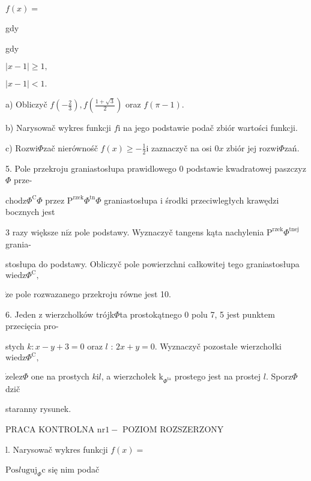 \documentclass[a4paper,12pt]{article}
\begin{document}
$f(x)=$

gdy

gdy

$|x-1|\geq 1,$

$|x-1|<1.$

a) Obliczyč $f(-\displaystyle \frac{2}{3}), f(\displaystyle \frac{1+\sqrt{3}}{2})$ oraz $f(\pi-1).$

b) Narysowač wykres funkcji $f\mathrm{i}$ na jego podstawie podač zbiór wartości funkcji.

c) Rozwi$\Phi$zač nierównośč $f(x)\displaystyle \geq-\frac{1}{2}\mathrm{i}$ zaznaczyč na osi $0x$ zbiór jej rozwi$\Phi$zań.

5. Pole przekroju graniastosłupa prawidlowego $0$ podstawie kwadratowej paszczyz$\Phi$ prze-

$\mathrm{c}\mathrm{h}\mathrm{o}\mathrm{d}\mathrm{z}\Phi^{\mathrm{C}}\Phi$ przez $\mathrm{P}^{\mathrm{r}\mathrm{z}\mathrm{e}\mathrm{k}}\Phi^{\mathrm{t}\mathrm{n}}\Phi$ graniastosłupa $\mathrm{i}$ środki przeciwległych krawędzi bocznych jest

3 razy większe $\mathrm{n}\mathrm{i}\dot{\mathrm{z}}$ pole podstawy. Wyznaczyč tangens kąta nachylenia $\mathrm{P}^{\mathrm{r}\mathrm{z}\mathrm{e}\mathrm{k}}\Phi^{\mathrm{t}\mathrm{n}\mathrm{e}\mathrm{j}}$ grania-

stosłupa do podstawy. Obliczyč pole powierzchni całkowitej tego graniastosłupa $\mathrm{w}\mathrm{i}\mathrm{e}\mathrm{d}\mathrm{z}\Phi^{\mathrm{C}},$

$\dot{\mathrm{z}}\mathrm{e}$ pole rozwazanego przekroju równe jest 10.

6. Jeden $\mathrm{z}$ wierzcholków trójk$\Phi$ta prostokątnego $0$ polu 7, 5 jest punktem przecięcia pro-

stych $k:x-y+3=0$ oraz $l$ : $2x+y=0$. Wyznaczyč pozostałe wierzchołki $\mathrm{w}\mathrm{i}\mathrm{e}\mathrm{d}\mathrm{z}\Phi^{\mathrm{C}},$

$\dot{\mathrm{z}}\mathrm{e}\mathrm{l}\mathrm{e}\mathrm{z}\Phi$ one na prostych $k\mathrm{i}l$, a wierzchołek $\mathrm{k}_{\Phi^{\mathrm{t}\mathrm{a}}}$ prostego jest na prostej $l$. Sporz$\Phi$dzič

staranny rysunek.




PRACA KONTROLNA $\mathrm{n}\mathrm{r} 1 -$ POZIOM ROZSZERZONY

l. Narysowač wykres funkcji $f(x)=$ 

$\mathrm{P}\mathrm{o}\mathrm{s}l\mathrm{u}\mathrm{g}\mathrm{u}\mathrm{j}_{\Phi}\mathrm{c}$ się nim podač
\end{document}
